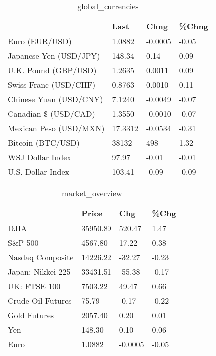\documentclass{article}%
\begin{document}
%


\begin{table}[htbp]%
\caption{global\_currencies}%
\centering%
\begin{adjustbox}{width=1\textwidth}%
\begin{tabular}{llll}
\toprule
                       &    Last &    Chng & \%Chng \\
\midrule
        Euro (EUR/USD) &  1.0882 & -0.0005 & -0.05 \\
Japanese Yen (USD/JPY) &  148.34 &    0.14 &  0.09 \\
  U.K. Pound (GBP/USD) &  1.2635 &  0.0011 &  0.09 \\
 Swiss Franc (USD/CHF) &  0.8763 &  0.0010 &  0.11 \\
Chinese Yuan (USD/CNY) &  7.1240 & -0.0049 & -0.07 \\
  Canadian \$ (USD/CAD) &  1.3550 & -0.0010 & -0.07 \\
Mexican Peso (USD/MXN) & 17.3312 & -0.0534 & -0.31 \\
     Bitcoin (BTC/USD) &   38132 &     498 &  1.32 \\
      WSJ Dollar Index &   97.97 &   -0.01 & -0.01 \\
     U.S. Dollar Index &  103.41 &   -0.09 & -0.09 \\
\bottomrule
\end{tabular}
%
\end{adjustbox}%
\end{table}

%


\begin{table}[htbp]%
\caption{market\_overview}%
\centering%
\begin{adjustbox}{width=1\textwidth}%
\begin{tabular}{llll}
\toprule
                  &    Price &     Chg &  \%Chg \\
\midrule
             DJIA & 35950.89 &  520.47 &  1.47 \\
          S\&P 500 &  4567.80 &   17.22 &  0.38 \\
 Nasdaq Composite & 14226.22 &  -32.27 & -0.23 \\
Japan: Nikkei 225 & 33431.51 &  -55.38 & -0.17 \\
     UK: FTSE 100 &  7503.22 &   49.47 &  0.66 \\
Crude Oil Futures &    75.79 &   -0.17 & -0.22 \\
     Gold Futures &  2057.40 &    0.20 &  0.01 \\
              Yen &   148.30 &    0.10 &  0.06 \\
             Euro &   1.0882 & -0.0005 & -0.05 \\
\bottomrule
\end{tabular}
%
\end{adjustbox}%
\end{table}

%
\end{document}
